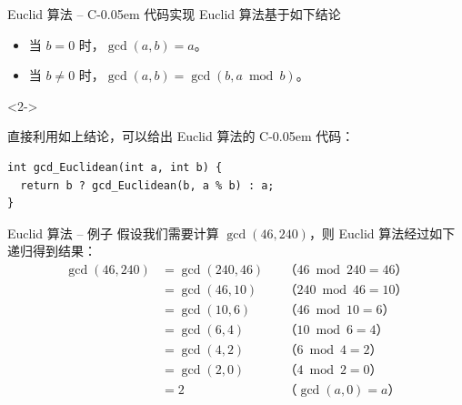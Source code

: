 \documentclass{../pkslide}
\newcommand{\Cpp}{\texorpdfstring{C\kern-0.05em\protect\raisebox{.35ex}{\textsmaller[2]{+\kern-0.05em+}}}{C++}}
\begin{document}
\begin{frame}[fragile]{Euclid 算法 -- \Cpp{} 代码实现}
  Euclid 算法基于如下结论
  
  \begin{itemize}
    \item 当 $b = 0$ 时，$\gcd(a, b) = a$。
    \item 当 $b \ne 0$ 时，$\gcd(a, b) = \gcd(b, a \bmod b)$。
  \end{itemize}
  
  \begin{visibleenv}<2->
    \emptyline
    
    直接利用如上结论，可以给出 Euclid 算法的 \Cpp{} 代码：
      
\begin{verbatim}
int gcd_Euclidean(int a, int b) {
  return b ? gcd_Euclidean(b, a % b) : a;
}
\end{verbatim}
  \end{visibleenv}
  
\end{frame}

\begin{frame}{Euclid 算法 -- 例子}
  假设我们需要计算 $\gcd(46, 240)$，则 Euclid 算法经过如下递归得到结果：%
  \begin{align*}
    \gcd(46, 240) &= \gcd(240, 46) & & \text{（$46 \bmod 240 = 46$）} \\
    &= \gcd(46, 10) & & \text{（$240 \bmod 46 = 10$）} \\
    &= \gcd(10, 6) & & \text{（$46 \bmod 10 = 6$）} \\
    &= \gcd(6, 4) & & \text{（$10 \bmod 6 = 4$）} \\
    &= \gcd(4, 2) & & \text{（$6 \bmod 4 = 2$）} \\
    &= \gcd(2, 0) & & \text{（$4 \bmod 2 = 0$）} \\
    &= 2 & & \text{（$\gcd(a, 0) = a$）} \\
  \end{align*}
\end{frame}
\end{document}
